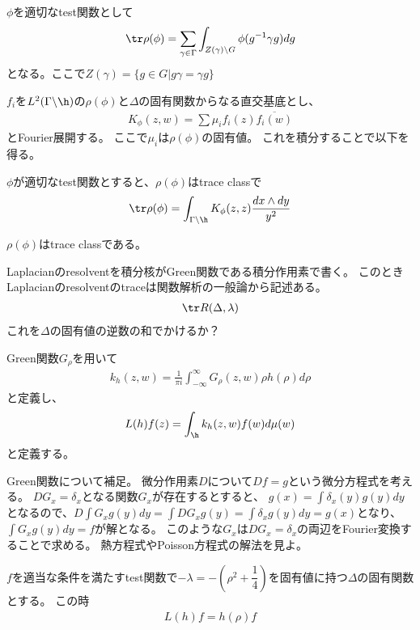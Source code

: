 \documentclass{jsarticle}
\begin{document}
\begin{thm}
$\phi$を適切なtest関数として
\begin{align*}
\tr\rho(\phi)=\sum_{\gamma\in\Gamma}\int_{Z(\gamma)\backslash G}\phi(g^{-1}\gamma  g)dg
\end{align*}
となる。ここで$Z(\gamma)=\{g\in G\vert g\gamma=\gamma g\}$
\end{thm}

$f_i$を$L^2(\Gamma\backslash\h)$の$\rho(\phi)$と$\Delta$の固有関数からなる直交基底とし、
\begin{align*}
K_\phi(z,w)=\sum\mu_i f_i(z)\overline{f_i(w)}
\end{align*}
とFourier展開する。
ここで$\mu_i$は$\rho(\phi)$の固有値。
これを積分することで以下を得る。
\begin{thm}
$\phi$が適切なtest関数とすると、$\rho(\phi)$はtrace classで
\begin{align*}
\tr\rho(\phi)=\int_{\Gamma\backslash\h}K_\phi(z,z)\frac{dx\wedge dy}{y^2}
\end{align*}
\end{thm}

$\rho(\phi)$はtrace classである。

Laplacianのresolventを積分核がGreen関数である積分作用素で書く。
このときLaplacianのresolventのtraceは関数解析の一般論から記述ある。
\begin{align*}
\tr R(\Delta, \lambda)
\end{align*}
これを$\Delta$の固有値の逆数の和でかけるか？

Green関数$G_\rho$を用いて
\begin{align*}
k_h(z,w)=\frac{1}{\pi i}\int^\infty_{-\infty}G_\rho(z,w)\rho h(\rho)d\rho
\end{align*}
と定義し、
\begin{align*}
L(h)f(z)=\int_{\h}k_h(z,w)f(w)d\mu(w)
\end{align*}
と定義する。

Green関数について補足。
微分作用素$D$について$Df=g$という微分方程式を考える。
$DG_x=\delta_x$となる関数$G_x$が存在するとすると、
$g(x)=\int\delta_x(y)g(y)dy$となるので、$D\int G_xg(y)dy=\int DG_xg(y)=\int \delta_xg(y)dy=g(x)$となり、
$\int G_xg(y)dy=f$が解となる。
このような$G_x$は$DG_x=\delta_x$の両辺をFourier変換することで求める。
熱方程式やPoisson方程式の解法を見よ。

\begin{prop}
$f$を適当な条件を満たすtest関数で$-\lambda=-(\rho^2+\dfrac{1}{4})$を固有値に持つ$\Delta$の固有関数とする。
この時
\begin{align*}
L(h)f=h(\rho)f
\end{align*}
\end{prop}
\end{document}
